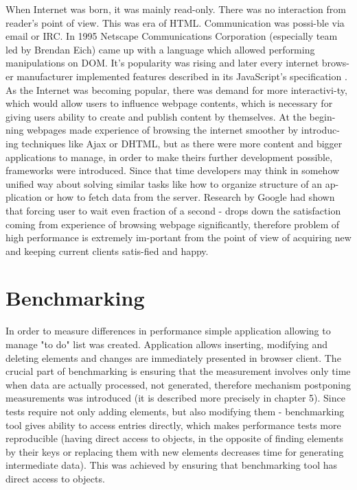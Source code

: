 \documentclass[inzynier,druk,ramka]{tex/dyplom}
\begin{document}
When Internet was born, it was mainly read-only. There was no interaction from reader’s point of view. This was era of HTML. Communication was possi-ble via email or IRC. In 1995 Netscape Communications Corporation (especially team led by Brendan Eich) came up with a language which allowed performing manipulations on DOM. It’s popularity was rising and later every internet brows-er manufacturer implemented features described in its JavaScript’s specification  . As the Internet was becoming popular, there was demand for more interactivi-ty, which would allow users to influence webpage contents, which is necessary for giving users ability to create and publish content by themselves. At the begin-ning webpages made experience of browsing the internet smoother by introduc-ing techniques like Ajax or DHTML, but as there were more content and bigger applications to manage, in order to make theirs further development possible, frameworks were introduced. Since that time developers may think in somehow unified way about solving similar tasks like how to organize structure of an ap-plication or how to fetch data from the server. 
Research by Google  had shown that forcing user to wait even fraction of a second - drops down the satisfaction coming from experience of browsing webpage significantly, therefore problem of high performance is extremely im-portant from the point of view of acquiring new and keeping current clients satis-fied and happy. 

\section{Benchmarking}
In order to measure differences in performance simple application allowing to manage "to do" list was created. Application allows inserting, modifying and deleting elements and changes are immediately presented in browser client. 
The crucial part of benchmarking is ensuring that the measurement involves only time when data are actually processed, not generated, therefore mechanism postponing measurements was introduced (it is described more precisely in chapter 5). Since tests require not only adding elements, but also modifying them - benchmarking tool gives ability to access entries directly, which makes performance tests more reproducible (having direct access to objects, in the opposite of finding elements by their keys or replacing them with new elements decreases time for generating intermediate data). This was achieved by ensuring that benchmarking tool has direct access to objects.
\end{document}
